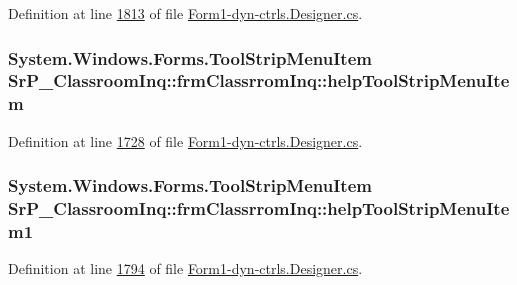 \-Definition at line \hyperlink{_form1-dyn-ctrls_8_designer_8cs_source_l01813}{1813} of file \hyperlink{_form1-dyn-ctrls_8_designer_8cs_source}{\-Form1-\/dyn-\/ctrls.\-Designer.\-cs}.

\hypertarget{class_sr_p___classroom_inq_1_1frm_classrrom_inq_a2cf34a0cb0b52c60e6faea821b2ce0a9}{
\subsubsection[{help\-Tool\-Strip\-Menu\-Item}]{\setlength{\rightskip}{0pt plus 5cm}\-System.\-Windows.\-Forms.\-Tool\-Strip\-Menu\-Item {\bf \-Sr\-P\-\_\-\-Classroom\-Inq\-::frm\-Classrrom\-Inq\-::help\-Tool\-Strip\-Menu\-Item}}}
\label{class_sr_p___classroom_inq_1_1frm_classrrom_inq_a2cf34a0cb0b52c60e6faea821b2ce0a9}


\-Definition at line \hyperlink{_form1-dyn-ctrls_8_designer_8cs_source_l01728}{1728} of file \hyperlink{_form1-dyn-ctrls_8_designer_8cs_source}{\-Form1-\/dyn-\/ctrls.\-Designer.\-cs}.

\hypertarget{class_sr_p___classroom_inq_1_1frm_classrrom_inq_a09bf82e0de8e7288e39988c7bfc5f5e7}{
\subsubsection[{help\-Tool\-Strip\-Menu\-Item1}]{\setlength{\rightskip}{0pt plus 5cm}\-System.\-Windows.\-Forms.\-Tool\-Strip\-Menu\-Item {\bf \-Sr\-P\-\_\-\-Classroom\-Inq\-::frm\-Classrrom\-Inq\-::help\-Tool\-Strip\-Menu\-Item1}}}
\label{class_sr_p___classroom_inq_1_1frm_classrrom_inq_a09bf82e0de8e7288e39988c7bfc5f5e7}


\-Definition at line \hyperlink{_form1-dyn-ctrls_8_designer_8cs_source_l01794}{1794} of file \hyperlink{_form1-dyn-ctrls_8_designer_8cs_source}{\-Form1-\/dyn-\/ctrls.\-Designer.\-cs}.

